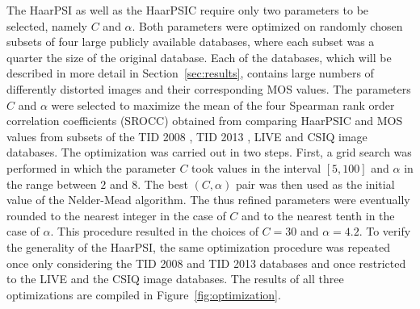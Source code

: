 \documentclass[11pt,a4paper]{article}
\begin{document}
The HaarPSI as well as the HaarPSIC require only two parameters to be selected, namely $C$ and $\alpha$. Both parameters were optimized on randomly chosen subsets of four large publicly available databases, where each subset was a quarter the size of the original database. Each of the databases, which will be described in more detail in Section~\ref{sec:results}, contains large numbers of differently distorted images and their corresponding MOS values.
The parameters $C$ and $\alpha$ were selected to maximize the mean of the four Spearman rank order correlation coefficients (SROCC) obtained from comparing HaarPSIC and MOS values from subsets of the TID 2008 \cite{PLZECB2009}, TID 2013  \cite{Ponomarenko2015}, LIVE \cite{SWCBOnline} and CSIQ \cite{LaCh2010} image databases. The optimization was carried out in two steps. First, a grid search was performed in which the parameter $C$ took values in the interval $[5,100]$ and $\alpha$ in the range between $2$ and $8$. The best $(C,\alpha)$ pair was then used as the initial value of the Nelder-Mead algorithm. The thus refined parameters were eventually rounded to the nearest integer in the case of $C$ and to the nearest tenth in the case of $\alpha$. This procedure resulted in the choices of $C=30$ and $\alpha = 4.2$.
To verify the generality of the HaarPSI, the same optimization procedure was repeated once only considering the TID 2008 and TID 2013 databases and once restricted to the LIVE and the CSIQ image databases. The results of all three optimizations are compiled in Figure~\ref{fig:optimization}.
\end{document}
